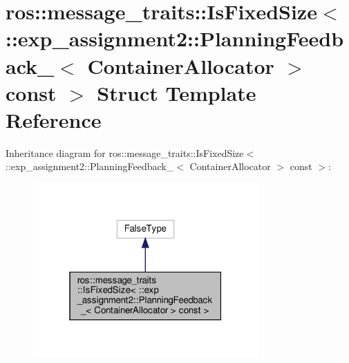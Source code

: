 \hypertarget{structros_1_1message__traits_1_1IsFixedSize_3_01_1_1exp__assignment2_1_1PlanningFeedback___3_01C0502a5aea988e0561c624b48d047bbd2}{}\section{ros\+:\+:message\+\_\+traits\+:\+:Is\+Fixed\+Size$<$ \+:\+:exp\+\_\+assignment2\+:\+:Planning\+Feedback\+\_\+$<$ Container\+Allocator $>$ const $>$ Struct Template Reference}
\label{structros_1_1message__traits_1_1IsFixedSize_3_01_1_1exp__assignment2_1_1PlanningFeedback___3_01C0502a5aea988e0561c624b48d047bbd2}


Inheritance diagram for ros\+:\+:message\+\_\+traits\+:\+:Is\+Fixed\+Size$<$ \+:\+:exp\+\_\+assignment2\+:\+:Planning\+Feedback\+\_\+$<$ Container\+Allocator $>$ const $>$\+:
\nopagebreak
\begin{figure}[H]
\begin{center}
\leavevmode
\includegraphics[width=244pt]{structros_1_1message__traits_1_1IsFixedSize_3_01_1_1exp__assignment2_1_1PlanningFeedback___3_01Cbc1c88c507d1126378173d158dfea127}
\end{center}
\end{figure}


